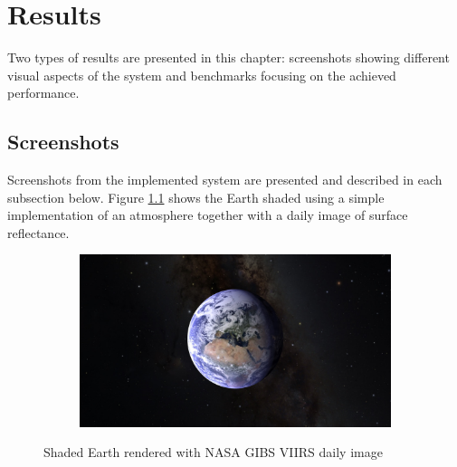 \chapter{Results}
\label{chapter:results}
Two types of results are presented in this chapter: screenshots showing different visual aspects of the system and benchmarks focusing on the achieved performance.

\section{Screenshots}
Screenshots from the implemented system are presented and described in each subsection below. Figure \ref{fig:researthshaded} shows the Earth shaded using a simple implementation of an atmosphere together with a daily image of surface reflectance.

\begin{figure}[h]
  \centering
  \begin{subfigure}[bt]{0.8\textwidth}
    \includegraphics[width=\textwidth]{figures/results/screenshots/specular_earth.jpg}
  \end{subfigure}
  \caption{Shaded Earth rendered with NASA GIBS VIIRS daily image \cite{gibs}}
  \label{fig:researthshaded}
\end{figure}

\clearpage
